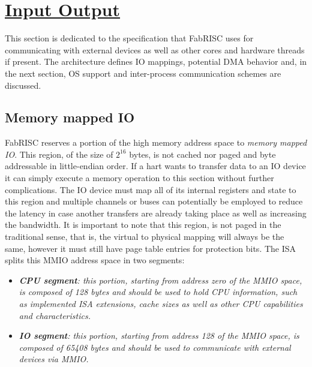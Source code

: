 \section[Input Output]{\LARGE\underline{Input Output}}

    \vspace{10pt}

    This section is dedicated to the specification that FabRISC uses for communicating with external devices as well as other cores and hardware threads if present. The architecture defines IO mappings, potential DMA behavior and, in the next section, OS support and inter-process communication schemes are discussed.

    \subsection{Memory mapped IO}

        \vspace{10pt}

        FabRISC reserves a portion of the high memory address space to \textit{memory mapped IO}. This region, of the size of $2^{16}$ bytes, is not cached nor paged and byte addressable in little-endian order. If a hart wants to transfer data to an IO device it can simply execute a memory operation to this section without further complications. The IO device must map all of its internal registers and state to this region and multiple channels or buses can potentially be employed to reduce the latency in case another transfers are already taking place as well as increasing the bandwidth. It is important to note that this region, is not paged in the traditional sense, that is, the virtual to physical mapping will always be the same, however it must still have page table entries for protection bits. The ISA splits this MMIO address space in two segments:

        \begin{itemize}

            \item \textit{\textbf{CPU segment}: this portion, starting from address zero of the MMIO space, is composed of 128 bytes and should be used to hold CPU information, such as implemented ISA extensions, cache sizes as well as other CPU capabilities and characteristics.}

            \item \textit{\textbf{IO segment}: this portion, starting from address 128 of the MMIO space, is composed of 65408 bytes and should be used to communicate with external devices via MMIO.}

        \end{itemize}

